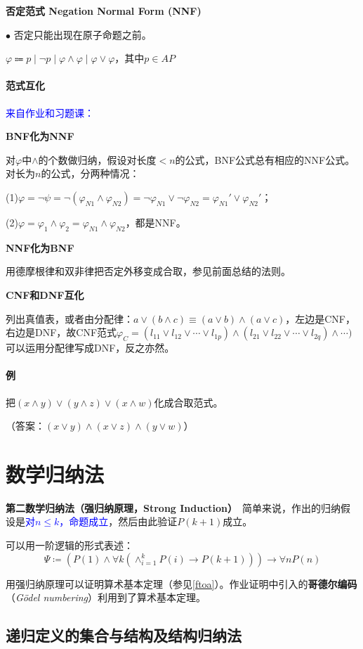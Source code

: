\documentclass[b5paper,oneside]{ctexbook}
\newcommand{\Blue}[1]{\textcolor[named]{blue}{#1}}
\begin{document}
\textbf{否定范式 Negation Normal Form (NNF)}

$\bullet$ 否定只能出现在原子命题之前。

$\varphi\Coloneqq p\mid\neg p\mid\varphi\land\varphi\mid\varphi\lor\varphi$，其中$p\in AP$
\paragraph{范式互化}
\Blue{来自作业和习题课：}

\textbf{BNF化为NNF}

对$\varphi$中$\land$的个数做归纳，假设对长度$<n$的公式，BNF公式总有相应的NNF公式。对长为$n$的公式，分两种情况：

(1)$\varphi = \neg \psi=\neg (\varphi_{N1}\land \varphi_{N2})=\neg \varphi_{N1}\lor \neg\varphi_{N2}=\varphi_{N1}'\lor \varphi_{N2}'$；

(2)$\varphi=\varphi_1\land\varphi_2=\varphi_{N1}\land \varphi_{N2}$，都是NNF。

\textbf{NNF化为BNF}

用德摩根律和双非律把否定外移变成合取，参见前面总结的法则。

\textbf{CNF和DNF互化}

列出真值表，或者由分配律：$a\lor (b\land c)\equiv(a\lor b)\land (a\lor c)$，左边是CNF，右边是DNF，故CNF范式$\varphi_C=(l_{11}\lor l_{12}\lor\cdots\lor l_{1p})\land (l_{21}\lor l_{22}\lor\cdots\lor l_{2q})\land\cdots)$可以运用分配律写成DNF，反之亦然。
\paragraph{例}把$(x \wedge y) \vee (y \wedge z) \vee (x \wedge w) $化成合取范式。

（答案：$(x \vee y) \wedge (x \vee z) \wedge (y \vee w)$）
\section{数学归纳法}
\textbf{第二数学归纳法（强归纳原理，Strong Induction）}\ 简单来说，作出的归纳假设是\Blue{对$n\leq k$，命题成立}，然后由此验证$P(k+1)$成立。

可以用一阶逻辑的形式表述：
\[\Psi\coloneqq (P(1)\land\forall k (\land_{i=1}^k P(i)\rightarrow P(k+1)))\rightarrow\forall n P(n)\]

用强归纳原理可以证明算术基本定理（参见\ref{ftoa}）。作业证明中引入的\textbf{哥德尔编码}（\textit{G\"odel numbering}）\label{godel}利用到了算术基本定理。
\subsection{递归定义的集合与结构及结构归纳法}
\end{document}
